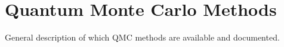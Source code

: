 \chapter{Quantum Monte Carlo Methods}
General description of which QMC methods are available and documented.
